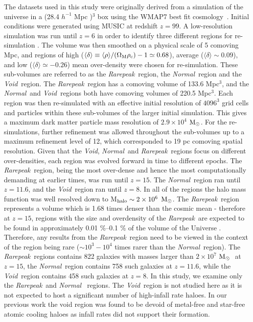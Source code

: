 \documentclass[graphics, twocolumn, usenatbib]{mn2e}
\newcommand{\mpch} {\rm $h^{-1}$ Mpc\,\,}
\newcommand{\msolar} {$\rm{M_{\odot}}~$}
\newcommand{\msolarc} {$\rm{M_{\odot}}$}
\newcommand{\rarepeak} {\textit{Rarepeak~}}
\newcommand{\normal} {\textit{Normal~}}
\newcommand{\void} {\textit{Void~}}
\newcommand{\voidc} {\textit{Void}}
\begin{document}
The datasets used in this study were originally derived from a simulation of the universe in a (28.4
\mpch)$^3$  box using the WMAP7 best fit cosmology~\citep{Komatsu_2011}.
Initial conditions were generated using
MUSIC \citep{Hahn_2011} at redshift $z = 99$. A low-resolution simulation was run until $z = 6$ in order to
identify three different regions for re-simulation \citep{Chen_2014}. The volume was then smoothed
on a physical scale of 5 comoving Mpc, and regions of high
($\langle\delta\rangle \equiv \langle\rho\rangle/(\Omega_{\rm M} \rho_{\rm c}) - 1 \simeq 0.68$),
average ($\langle\delta\rangle \sim 0.09$), and low ($\langle\delta\rangle \simeq -0.26$)
mean over-density were chosen for re-simulation. These sub-volumes are referred to as the
\rarepeak region, the \normal region  and the \void region. The \rarepeak region has a comoving
volume of 133.6 Mpc$^3$, and the \normal and \void regions both have comoving volumes of 220.5
Mpc$^3$. Each region was then re-simulated with an effective initial resolution of $4096^3$ grid
cells and particles within these sub-volumes of the larger initial simulation. This gives a maximum
dark matter particle mass resolution of $2.9 \times 10^4$ \msolarc. For the re-simulations, further refinement was allowed throughout the sub-volumes up
to a maximum refinement level of 12, which corresponded to 19 pc comoving spatial resolution. Given
that the
\voidc, \normal and \rarepeak regions focus on different over-densities, each region was evolved forward in time to
different epochs. The \rarepeak region, being the most over-dense and hence the most
computationally demanding at earlier times, was run until $z = 15$. The \normal region ran until $z =
11.6$, and the \void region ran until $z = 8$. In all of the regions the halo mass function was 
well resolved down to M$_{\rm halo} \sim 2 \times 10^6$ \msolarc. The \rarepeak region represents a
volume which is 1.68 times denser than the cosmic mean - therefore at $z = 15$, regions with the
size and overdensity of the \rarepeak are expected to be found in approximately 0.01 \%–0.1 \%
of the volume of the Universe \citep{Wise_2019}. Therefore, any results from the
\rarepeak region need to be viewed in the context of the region being rare ($\sim 10^3 - 10^4$ times rarer than the \normal region).
The \rarepeak regions contains 822 galaxies with masses larger than $2 \times 10^7$ \msolar
at $z = 15$, the \normal region contains 758 such galaxies at $z = 11.6$, while the \void region
contains 458 such galaxies at $z = 8$. In this study, we examine only the \rarepeak and \normal
regions. The \void region is not studied here as it is not expected to 
host a significant number of high-infall rate haloes. In our previous work
\citep{Wise_2019, Regan_2019} the void region was found to be devoid of metal-free and
star-free atomic cooling haloes as infall rates
did not support their formation. 
\end{document}
